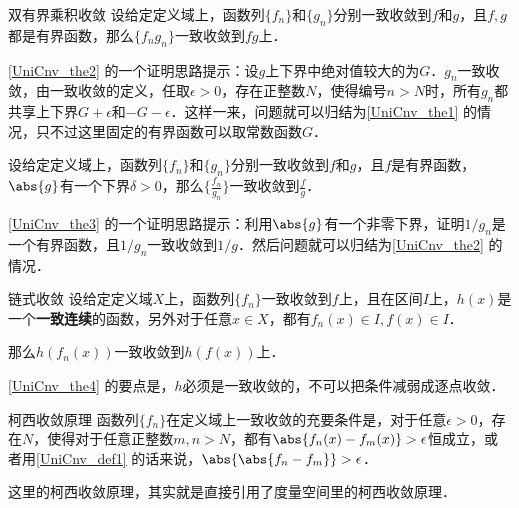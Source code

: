 \begin{theorem}{双有界乘积收敛}\label{UniCnv_the2}
设给定定义域上，函数列$\{f_n\}$和$\{g_n\}$分别一致收敛到$f$和$g$，且$f, g$都是有界函数，那么$\{f_ng_n\}$一致收敛到$fg$上．
\end{theorem}

\autoref{UniCnv_the2} 的一个证明思路提示：设$g$上下界中绝对值较大的为$G$．$g_n$一致收敛，由一致收敛的定义，任取$\epsilon>0$，存在正整数$N$，使得编号$n>N$时，所有$g_n$都共享上下界$G+\epsilon$和$-G-\epsilon$．这样一来，问题就可以归结为\autoref{UniCnv_the1} 的情况，只不过这里固定的有界函数可以取常数函数$G$．

\begin{theorem}{}\label{UniCnv_the3}
设给定定义域上，函数列$\{f_n\}$和$\{g_n\}$分别一致收敛到$f$和$g$，且$f$是有界函数，$\abs{g}$有一个下界$\delta>0$，那么$\{\frac{f_n}{g_n}\}$一致收敛到$\frac{f}{g}$．
\end{theorem}

\autoref{UniCnv_the3} 的一个证明思路提示：利用$\abs{g}$有一个非零下界，证明$1/g_n$是一个有界函数，且$1/g_n$一致收敛到$1/g$．然后问题就可以归结为\autoref{UniCnv_the2} 的情况．

\begin{theorem}{链式收敛}\label{UniCnv_the4}
设给定定义域$X$上，函数列$\{f_n\}$一致收敛到$f$上，且在区间$I$上，$h(x)$是一个\textbf{一致连续}的函数，另外对于任意$x\in X$，都有$f_n(x)\in I, f(x)\in I$．

那么$h(f_n(x))$一致收敛到$h(f(x))$上．
\end{theorem}

\autoref{UniCnv_the4} 的要点是，$h$必须是一致收敛的，不可以把条件减弱成逐点收敛．

\begin{theorem}{柯西收敛原理}
函数列$\{f_n\}$在定义域上一致收敛的充要条件是，对于任意$\epsilon>0$，存在$N$，使得对于任意正整数$m, n>N$，都有$\abs{f_n(x)-f_m(x)}>\epsilon$恒成立，或者用\autoref{UniCnv_def1} 的话来说，$\abs{\abs{f_n-f_m}}>\epsilon$．
\end{theorem}

这里的柯西收敛原理，其实就是直接引用了度量空间里的柯西收敛原理．











